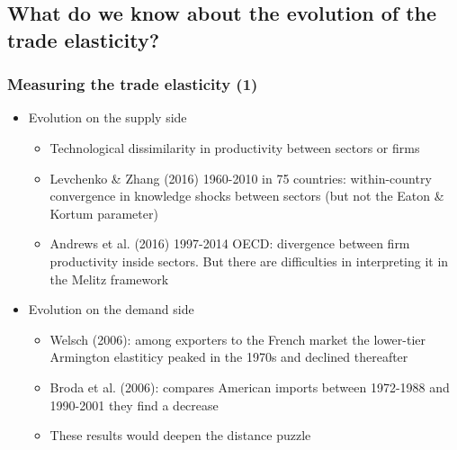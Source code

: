 \documentclass{beamer}
\begin{document}
\subsection{What do we know about the evolution of the trade elasticity?}

\begin{frame}\frametitle{Measuring the trade elasticity (1)}

\begin{itemize}
\item Evolution on the supply side
	\begin{itemize}
	\item Technological dissimilarity in productivity between sectors or firms
	\item Levchenko \& Zhang (2016) 1960-2010 in 75 countries: within-country convergence in knowledge shocks between sectors (but not the Eaton \& Kortum parameter)
	\item Andrews et al. (2016) 1997-2014 OECD: divergence between firm productivity inside sectors. But there are difficulties in interpreting it in the Melitz framework
	\end{itemize}
\item Evolution on the demand side
	\begin{itemize}
	\item Welsch (2006): among exporters to the French market the lower-tier Armington elastiticy peaked in the 1970s and declined thereafter
	\item Broda et al. (2006): compares American imports between 1972-1988 and 1990-2001 they find a decrease
	\item These results would deepen the distance puzzle
	\end{itemize}
\end{itemize}
\end{frame}	
\end{document}
